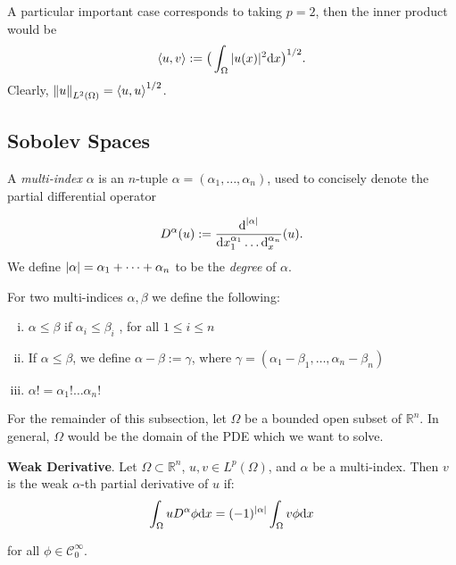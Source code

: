 \begin{exmp}
	A particular important case corresponds to taking $p=2$, then the inner product would be
	\begin{equation*}
	\mathop{\langle u, v \rangle} := \big( \int_{\Omega} \vert u(x)\vert^2 \text{d}x \big)^{1/2}.
	\end{equation*}
	Clearly, $\left\lVert u\right\rVert_{L^2(\Omega)} = \mathop{\langle u, u \rangle}^{1/2}$.
\end{exmp}
\subsection{Sobolev Spaces}
\begin{defn}
	A \textit{multi-index} $\alpha$ is an $n$-tuple $\alpha = (\alpha_1, \dots, \alpha_n)$, used to concisely
denote the partial differential operator

	\begin{equation}
		D^\alpha (u) := \frac{\text{d}^{\vert\alpha\vert}}{\text{d}x_{1}^{\alpha_1}\dots\text{d}_{x}^{\alpha_n}} (u).
	\end{equation}
	We define $ \vert\alpha\vert = \alpha_1 + \dots + \alpha_n $ to be the \textit{degree} of $\alpha$.
\end{defn}

\begin{defn}
	For two multi-indices $\alpha, \beta$ we define the following:
	\begin{enumerate}[i.]
		\item $\alpha \leq \beta$ if $\alpha_i \leq \beta_i$ , for all $1 \leq i \leq n$
		\item If $\alpha \leq \beta$, we define $\alpha - \beta := \gamma$, where $\gamma = (\alpha_1-\beta_1, \dots,\alpha_n - \beta_n)$
		\item $\alpha! = \alpha_1!\dots\alpha_n!$
	\end{enumerate}
\end{defn}
\begin{notation}
	For the remainder of this subsection, let $\Omega$ be a bounded open subset of
$\mathbb{R}^n$. In general, $\Omega$ would be the domain of the PDE which we want to solve.
\end{notation}
\begin{defn}
	\textbf{Weak Derivative}. Let $\Omega \subset \mathbb{R}^n$, $u, v \in L^p(\Omega)$, and $\alpha$ be a multi-index. Then $v$ is the
weak $\alpha$-th partial derivative of $u$ if:
	\begin{equation*}
	\int_{\Omega} uD^\alpha\phi \text{d}x = (-1)^{\vert\alpha\vert}\int_{\Omega}v\phi\text{d}x
	\end{equation*}

	for all $\phi \in \mathscr{C}_{0}^{\infty}$.
\end{defn}

